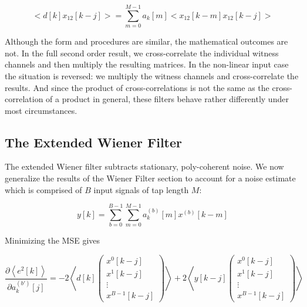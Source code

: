 \documentclass{article}
\begin{document}
\begin{equation}
    \bigg<d[k]x_{12}[k-j]\bigg> = \sum_{m=0}^{M-1}a_k[m]
    \bigg<x_{12}[k-m]x_{12}[k-j]\bigg>
\end{equation}

Although the form and procedures are similar, the mathematical
outcomes are not. In the full second order result, we cross-correlate
the individual witness channels and then multiply the resulting
matrices. In the non-linear input case the situation is reversed:
we multiply the witness channels and cross-correlate the results.
And since the product of cross-correlations is not the same as the
cross-correlation of a product in general, these filters behave
rather differently under most circumstances.


\subsection{The Extended Wiener Filter}
The extended Wiener filter subtracts stationary, poly-coherent noise. We now
generalize the results of the Wiener Filter section to account for a noise
estimate which is comprised of $B$ input signals of tap length $M$:

\begin{equation}
    y[k] = \sum_{b=0}^{B-1}\sum_{m=0}^{M-1} a_k^{(b)}[m] x^{(b)}[k-m]
\end{equation}

Minimizing the MSE gives

\begin{equation}
    \frac{\partial \left<e^2[k]\right>}{\partial a_k^{(b')}[j]} = 
    -2\left<d[k]
    \begin{pmatrix}
        x^0[k-j]\\
        x^1[k-j]\\
        \vdots\\
        x^{B-1}[k-j]
    \end{pmatrix}
    \right>
    + 2\left<y[k-j]
    \begin{pmatrix}
        x^0[k-j]\\
        x^1[k-j]\\
        \vdots\\
        x^{B-1}[k-j]
    \end{pmatrix}
    \right>
\end{equation}
\end{document}
